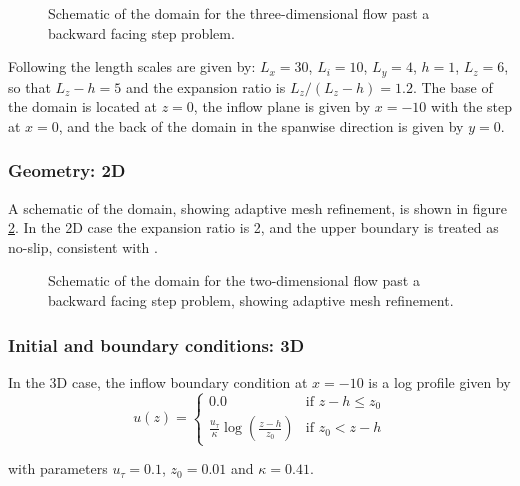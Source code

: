 \begin{figure}
\centering
{}
\caption{Schematic of the domain for the three-dimensional flow past a backward facing step
problem.}
\label{fig:Schematic3d}
\end{figure}

Following \cite{le1997} the length scales are given by: $L_x=30$, $L_i=10$, $L_y=4$, $h=1$, $L_z=6$,
so that $L_z-h=5$ and the expansion ratio is $L_z/(L_z-h)=1.2$.
The base of the domain is located at $z=0$, the inflow plane is given by $x=-10$ with the step
at $x=0$, and the back of the domain in the spanwise direction is given by $y=0$.

\subsubsection{Geometry: 2D}
A schematic of the domain, showing adaptive mesh refinement, is shown in figure \ref{fig:Schematic2d}.
In the 2D case the expansion ratio is 2, and the upper boundary is treated as no-slip,
consistent with \cite{armaly1983}.

\begin{figure}
\centering
{}
\caption{Schematic of the domain for the two-dimensional flow past a backward facing step
problem, showing adaptive mesh refinement.}
\label{fig:Schematic2d}
\end{figure}


\subsubsection{Initial and boundary conditions: 3D}
In the 3D case, the inflow boundary condition at $x=-10$ is a log profile given by
\begin{equation*}
u(z) =
  \begin{cases}
    0.0 & \text{if } z-h \leq z_0 \\
    \frac{u_{\tau}}{\kappa} \log \left(\frac{z - h}{z_0}\right) & \text{if } z_0 < z-h
  \end{cases}
\end{equation*}

with parameters $u_{\tau} = 0.1$, $z_0 = 0.01$ and $\kappa = 0.41$.


